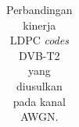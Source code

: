 \begin{table} [t]
	\centering
	\caption{Perbandingan kinerja LDPC \textit{codes} DVB-T2 yang diusulkan pada kanal AWGN.}
	\label{tab:tab1}
\begin{adjustbox}{width=1\textwidth , totalheight=\baselineskip,keepaspectratio}
	\begin{tabular}{|c|p{2.75cm}|p{2.75cm}|p{2.75cm}|p{2.75cm}|}

\end{tabular}
\end{adjustbox}
\end{table}
